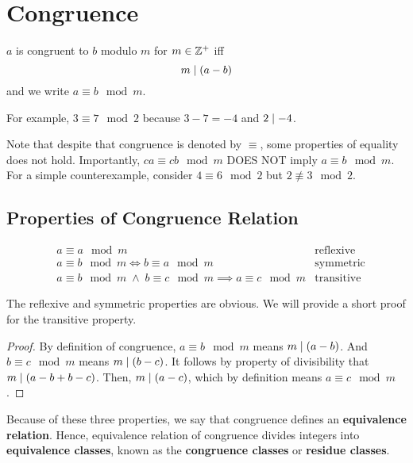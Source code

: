

\newcommand\lcm{\mathrm{lcm}}



\section{Congruence}

\begin{definition}
    $a$ is congruent to $b$ modulo $m$ for $m \in \mathbb{Z}^+$ iff
    $$
    m \mathrel{\mid} (a-b)
    $$
    and we write $a \equiv b \mod m$.
\end{definition}

For example, $3 \equiv 7 \mod 2$ because $3-7 = -4$ and $2 \mathrel{\mid} -4$.

\begin{remark}
    Note that despite that congruence is denoted by $\equiv$, some properties of equality does not hold. Importantly, $ca \equiv cb \mod m$ DOES NOT imply $a \equiv b \mod m$. For a simple counterexample, consider $4 \equiv 6 \mod 2$ but $2 \not\equiv 3 \mod 2$.
\end{remark}

\subsection{Properties of Congruence Relation}

$$
\begin{aligned}
    &a \equiv a \mod m & \text{reflexive} \\
    &a \equiv b \mod m \iff b \equiv a \mod m & \text{symmetric} \\
    &a \equiv b \mod m \;\land\; b \equiv c \mod m \implies a \equiv c \mod m & \text{transitive}
\end{aligned}
$$

The reflexive and symmetric properties are obvious. We will provide a short proof for the transitive property.

\begin{proof}
    By definition of congruence, $a \equiv b \mod m$ means $m \mathrel{\mid} (a-b)$. And $b \equiv c \mod m$ means $m \mathrel{\mid} (b-c)$. It follows by property of divisibility that $m \mathrel{\mid} (a-b+b-c)$. Then, $m \mathrel{\mid} (a-c)$, which by definition means $a \equiv c \mod m$.
\end{proof}

Because of these three properties, we say that congruence defines an \textbf{equivalence relation}. Hence, equivalence relation of congruence divides integers into \textbf{equivalence classes}, known as the \textbf{congruence classes} or \textbf{residue classes}.

